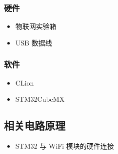 \documentclass[a4paper,12pt,english]{sphinxmanual}
\begin{document}
\subsubsection{硬件}
\label{\detokenize{exp-stm32/mqtt:id3}}\begin{itemize}
\item {} 
\sphinxAtStartPar
物联网实验箱

\item {} 
\sphinxAtStartPar
USB 数据线

\end{itemize}


\subsubsection{软件}
\label{\detokenize{exp-stm32/mqtt:id4}}\begin{itemize}
\item {} 
\sphinxAtStartPar
CLion

\item {} 
\sphinxAtStartPar
STM32CubeMX

\end{itemize}


\subsection{相关电路原理}
\label{\detokenize{exp-stm32/mqtt:id5}}\begin{itemize}
\item {} 
\sphinxAtStartPar
STM32 与 WiFi 模块的硬件连接

\end{itemize}

\sphinxAtStartPar
{}
\end{document}
